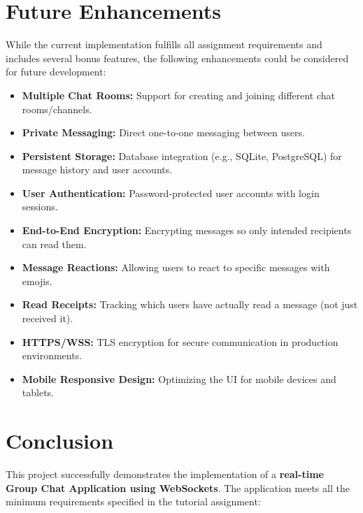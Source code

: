 \documentclass[12pt, a4paper]{article}
\begin{document}
\section{Future Enhancements}

While the current implementation fulfills all assignment requirements and includes several bonus features, the following enhancements could be considered for future development:

\begin{itemize}[leftmargin=*]
    \item \textbf{Multiple Chat Rooms:} Support for creating and joining different chat rooms/channels.
    \item \textbf{Private Messaging:} Direct one-to-one messaging between users.
    \item \textbf{Persistent Storage:} Database integration (e.g., SQLite, PostgreSQL) for message history and user accounts.
    \item \textbf{User Authentication:} Password-protected user accounts with login sessions.
    \item \textbf{End-to-End Encryption:} Encrypting messages so only intended recipients can read them.
    \item \textbf{Message Reactions:} Allowing users to react to specific messages with emojis.
    \item \textbf{Read Receipts:} Tracking which users have actually read a message (not just received it).
    \item \textbf{HTTPS/WSS:} TLS encryption for secure communication in production environments.
    \item \textbf{Mobile Responsive Design:} Optimizing the UI for mobile devices and tablets.
\end{itemize}


\section{Conclusion}

This project successfully demonstrates the implementation of a \textbf{real-time Group Chat Application using WebSockets}. The application meets all the minimum requirements specified in the tutorial assignment:
\end{document}
